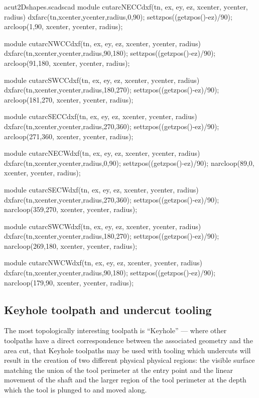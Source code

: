\documentclass{ltxdoc}
\begin{document}
\lstset{firstnumber=\thecuttwod}
\begin{writecode}{a}{cut2Dshapes.scad}{scad}
module cutarcNECCdxf(tn, ex, ey, ez, xcenter, ycenter, radius) {
  dxfarc(tn,xcenter,ycenter,radius,0,90);
  settzpos((getzpos()-ez)/90);
    arcloop(1,90, xcenter, ycenter, radius);
}

module cutarcNWCCdxf(tn, ex, ey, ez, xcenter, ycenter, radius) {
  dxfarc(tn,xcenter,ycenter,radius,90,180);
  settzpos((getzpos()-ez)/90);
    arcloop(91,180, xcenter, ycenter, radius);
}

module cutarcSWCCdxf(tn, ex, ey, ez, xcenter, ycenter, radius) {
  dxfarc(tn,xcenter,ycenter,radius,180,270);
  settzpos((getzpos()-ez)/90);
    arcloop(181,270, xcenter, ycenter, radius);
}

module cutarcSECCdxf(tn, ex, ey, ez, xcenter, ycenter, radius) {
  dxfarc(tn,xcenter,ycenter,radius,270,360);
  settzpos((getzpos()-ez)/90);
    arcloop(271,360, xcenter, ycenter, radius);
}

module cutarcNECWdxf(tn, ex, ey, ez, xcenter, ycenter, radius) {
  dxfarc(tn,xcenter,ycenter,radius,0,90);
  settzpos((getzpos()-ez)/90);
    narcloop(89,0, xcenter, ycenter, radius);
}

module cutarcSECWdxf(tn, ex, ey, ez, xcenter, ycenter, radius) {
  dxfarc(tn,xcenter,ycenter,radius,270,360);
  settzpos((getzpos()-ez)/90);
    narcloop(359,270, xcenter, ycenter, radius);
}

module cutarcSWCWdxf(tn, ex, ey, ez, xcenter, ycenter, radius) {
  dxfarc(tn,xcenter,ycenter,radius,180,270);
  settzpos((getzpos()-ez)/90);
    narcloop(269,180, xcenter, ycenter, radius);
}

module cutarcNWCWdxf(tn, ex, ey, ez, xcenter, ycenter, radius) {
  dxfarc(tn,xcenter,ycenter,radius,90,180);
  settzpos((getzpos()-ez)/90);
    narcloop(179,90, xcenter, ycenter, radius);
}

\end{writecode}
\addtocounter{cuttwod}{40}
 
\subsection{Keyhole toolpath and undercut tooling}
 
\label{subsec:keyholetoolpaths}
The most topologically interesting toolpath is ``Keyhole'' --- where other toolpaths have a 
direct correspondence between the associated geometry and the area cut, that Keyhole toolpaths
may be used with tooling which undercuts will result in the creation of two different physical
physical regions: the visible surface matching the union of the tool perimeter at the entry point
and the linear movement of the shaft and the larger region of the tool perimeter at the depth
which the tool is plunged to and moved along.
 
\end{document}
